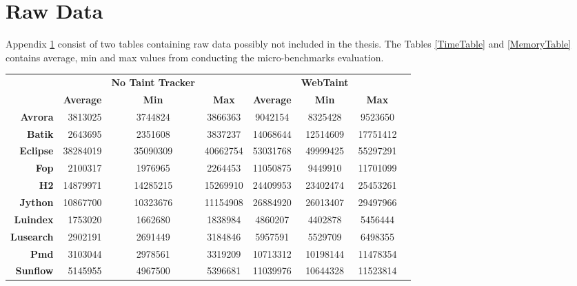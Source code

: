 \chapter{Raw Data}
\label{appendix:raw}
Appendix \ref{appendix:raw} consist of two tables containing raw data possibly not included in the thesis. The Tables \ref{TimeTable} and \ref{MemoryTable} contains average, min and max values from conducting the micro-benchmarks evaluation.

\begin{sidewaystable}
  \centering
  \caption{Time measurements (ms) from executing The DaCapo Benchmark Suite, with and without WebTaint, ten times.}
  \label{TimeTable}
  \begin{tabular}{rrcccccc}
    & & \textbf{No Taint Tracker} & & & \textbf{WebTaint} & \\
    & \textbf{Average} & \textbf{Min} & \textbf{Max} & \textbf{Average} & \textbf{Min} & \textbf{Max} \\
    \textbf{Avrora}     & 3813025          & 3744824      & 3866363      & 9042154          & 8325428      & 9523650      \\
    \textbf{Batik}      & 2643695          & 2351608      & 3837237      & 14068644         & 12514609     & 17751412     \\
    \textbf{Eclipse}    & 38284019         & 35090309     & 40662754     & 53031768         & 49999425     & 55297291     \\
    \textbf{Fop}        & 2100317          & 1976965      & 2264453      & 11050875         & 9449910      & 11701099     \\
    \textbf{H2}         & 14879971         & 14285215     & 15269910     & 24409953         & 23402474     & 25453261     \\
    \textbf{Jython}     & 10867700         & 10323676     & 11154908     & 26884920         & 26013407     & 29497966     \\
    \textbf{Luindex}    & 1753020          & 1662680      & 1838984      & 4860207          & 4402878      & 5456444      \\
    \textbf{Lusearch}   & 2902191          & 2691449      & 3184846      & 5957591          & 5529709      & 6498355      \\
    \textbf{Pmd}        & 3103044          & 2978561      & 3319209      & 10713312         & 10198144     & 11478354     \\
    \textbf{Sunflow}    & 5145955          & 4967500      & 5396681      & 11039976         & 10644328     & 11523814     \\

\end{tabular}
\end{sidewaystable}
